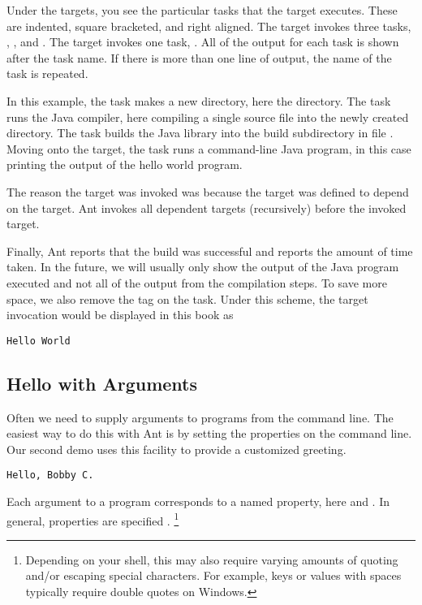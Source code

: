 Under the targets, you see the particular tasks that the target
executes.  These are indented, square bracketed, and right aligned.
The  target invokes three tasks, , ,
and .  The  target invokes one task, .
All of the output for each task is shown after the task name.  If
there is more than one line of output, the name of the task is
repeated.

In this example, the  task makes a new directory, here the 
 directory.  The  task runs the
Java compiler, here compiling a single source file into the
newly created directory.  The  task builds the Java
library into the build subdirectory  in file
.  Moving onto the  target,
the  task runs a command-line Java program, in this
case printing the output of the hello world program.

The reason the  target was invoked was because the
 target was defined to depend on the  target.
Ant invokes all dependent targets (recursively) before the invoked
target.

Finally, Ant reports that the build was successful and reports the
amount of time taken.  In the future, we will usually only show the
output of the Java program executed and not all of the output from the
compilation steps.  To save more space, we also remove the
\code{[java]} tag on the task.  Under this scheme, the 
target invocation would be displayed in this book as
%
\begin{verbatim}
Hello World
\end{verbatim}

\subsection{Hello with Arguments}

Often we need to supply arguments to programs from the command
line.  The easiest way to do this with Ant is by setting the
properties on the command line.  Our second demo uses this facility
to provide a customized greeting.
%
\begin{verbatim}
Hello, Bobby C.
\end{verbatim}
%
Each argument to a program corresponds to a named property, here
 and .  In general, properties are specified
.%
%
\footnote{Depending on your shell, this may also require varying
  amounts of quoting and/or escaping special characters.  For example,
  keys or values with spaces typically require double quotes on
  Windows.}


